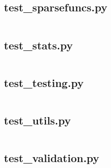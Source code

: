 \documentclass{article}
\begin{document}
\subsection{test\_sparsefuncs.py}
\inputminted{python}{/home/dufferzafar/dev/@clones/scikit-learn/sklearn/utils/tests/test_sparsefuncs.py}
\newpage

\subsection{test\_stats.py}
\inputminted{python}{/home/dufferzafar/dev/@clones/scikit-learn/sklearn/utils/tests/test_stats.py}
\newpage

\subsection{test\_testing.py}
\inputminted{python}{/home/dufferzafar/dev/@clones/scikit-learn/sklearn/utils/tests/test_testing.py}
\newpage

\subsection{test\_utils.py}
\inputminted{python}{/home/dufferzafar/dev/@clones/scikit-learn/sklearn/utils/tests/test_utils.py}
\newpage

\subsection{test\_validation.py}
\inputminted{python}{/home/dufferzafar/dev/@clones/scikit-learn/sklearn/utils/tests/test_validation.py}
\newpage


\end{document}
